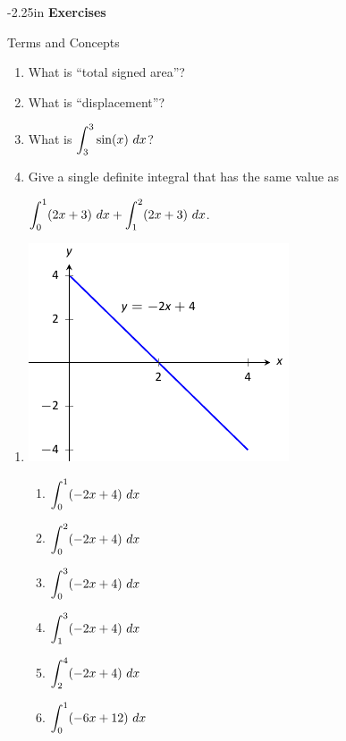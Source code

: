 \begin{adjustwidth*}{}{-2.25in}
\textbf{{\large Exercises}}
\setlength{\columnsep}{25pt}
\begin{multicols*}{2}
\noindent Terms and Concepts \small
\begin{enumerate}[1)]
\item What is ``total signed area''?
\item What is ``displacement''?
\item What is $\ds \int_3^3 \sin (x)\ dx$?
\item Give a single definite integral that has the same value as 

$\ds \int_0^1(2x+3)\ dx + \int_1^2 (2x+3)\ dx$.
\end{enumerate} 

 \small


\begin{enumerate}[1),resume]
\item \noindent
\begin{minipage}{\linewidth}
\includegraphics[scale=.8]{figures/fig05_02_ex_05}
\end{minipage}
\bmtwo
\begin{enumerate}
\item		$\ds \int_0^1 (-2x+4)\ dx$
\item		$\ds \int_0^2 (-2x+4)\ dx$
\item		$\ds \int_0^3 (-2x+4)\ dx$
\item		$\ds \int_1^3 (-2x+4)\ dx$
\item		$\ds \int_2^4 (-2x+4)\ dx$
\item		$\ds \int_0^1 (-6x+12)\ dx$
\end{enumerate}
\emtwo


\end{enumerate}
\end{multicols*}
\end{adjustwidth*}
